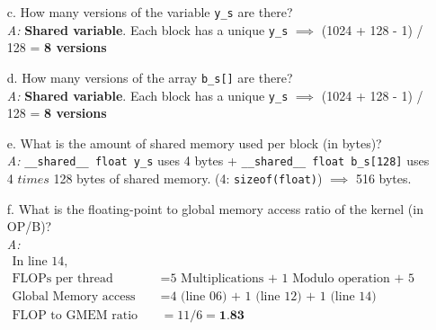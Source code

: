 \begin{enumerate}
\begin{itemize}
                  \item[c.] How many versions of the variable \texttt{y\_s} are there?
                        \\\textsl{A:} \textbf{Shared variable}. Each block has a unique \texttt{y\_s} \(\implies\) (1024 + 128 - 1) / 128 = \textbf{8 versions}
                  \item[d.] How many versions of the array \texttt{b\_s[]} are there?
                        \\\textsl{A:} \textbf{Shared variable}. Each block has a unique \texttt{y\_s} \(\implies\) (1024 + 128 - 1) / 128 = \textbf{8 versions}
                  \item [e.] What is the amount of shared memory used per block (in bytes)?
                        \\\textsl{A:} \texttt{\_\_shared\_\_ float y\_s} uses 4 bytes + \texttt{\_\_shared\_\_ float b\_s[128]} uses 4 \(times\) 128 bytes of shared memory. (4: \texttt{sizeof(float)}) $\implies$ 516 bytes.
                  \item [f.] What is the floating-point to global memory access ratio of the kernel (in OP/B)?
                        \\\textsl{A:}
                        \begin{equation*}
                              \begin{aligned}
                                    \text{In line 14,}                &                                                               \\
                                    \text{FLOPs per thread}           & = \text{5 Multiplications + 1 Modulo operation + 5 Additions} \\
                                    \text{Global Memory access count} & = \text{4 (line 06) + 1 (line 12) + 1 (line 14)}              \\
                                    \text{FLOP to GMEM ratio}         & = 11 / 6 = \textbf{1.83}
                              \end{aligned}
                        \end{equation*}
            \end{itemize}


\end{enumerate}
